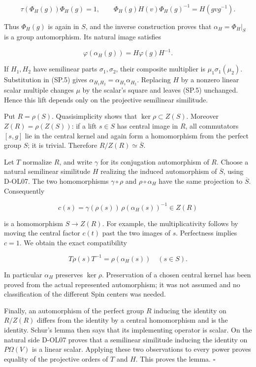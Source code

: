\[
 \tau(\Phi_H(g))\Phi_H(g)=1,\qquad
 \Phi_H(g)H(v)\Phi_H(g)^{-1}=H(gvg^{-1}).
 \tag{SP.8}
\]

Thus \(\Phi_H(g)\) is again in \(S\), and the inverse construction proves that \(\alpha_H=\Phi_H|_S\) is a group automorphism. Its natural image satisfies

\[
 \varphi(\alpha_H(g))=H\varphi(g)H^{-1}.
 \tag{SP.9}
\]

If \(H_1,H_2\) have semilinear parts \(\sigma_1,\sigma_2\), their composite multiplier is \(\mu_1\sigma_1(\mu_2)\). Substitution in (SP.5) gives \(\alpha_{H_1H_2}=\alpha_{H_1}\alpha_{H_2}\). Replacing \(H\) by a nonzero linear scalar multiple changes \(\mu\) by the scalar's square and leaves (SP.5) unchanged. Hence this lift depends only on the projective semilinear similitude.

Put \(R=\rho(S)\). Quasisimplicity shows that \(\ker\rho\subset Z(S)\). Moreover \(Z(R)=\rho(Z(S))\): if a lift \(s\in S\) has central image in \(R\), all commutators \([s,g]\) lie in the central kernel and again form a homomorphism from the perfect group \(S\); it is trivial. Therefore \(R/Z(R)\simeq\overline S\).

Let \(T\) normalize \(R\), and write \(\gamma\) for its conjugation automorphism of \(R\). Choose a natural semilinear similitude \(H\) realizing the induced automorphism of \(\overline S\), using D-OL07. The two homomorphisms \(\gamma\circ\rho\) and \(\rho\circ\alpha_H\) have the same projection to \(\overline S\). Consequently

\[
 c(s)=\gamma(\rho(s))\,\rho(\alpha_H(s))^{-1}\in Z(R)
 \tag{SP.10}
\]

is a homomorphism \(S\to Z(R)\). For example, the multiplicativity follows by moving the central factor \(c(t)\) past the two images of \(s\). Perfectness implies \(c=1\). We obtain the exact compatibility

\[
 T\rho(s)T^{-1}=\rho(\alpha_H(s))\quad(s\in S).
 \tag{SP.11}
\]

In particular \(\alpha_H\) preserves \(\ker\rho\). Preservation of a chosen central kernel has been proved from the actual represented automorphism; it was not assumed and no classification of the different Spin centers was needed.

Finally, an automorphism of the perfect group \(R\) inducing the identity on \(R/Z(R)\) differs from the identity by a central homomorphism and is the identity. Schur's lemma then says that its implementing operator is scalar. On the natural side D-OL07 proves that a semilinear similitude inducing the identity on \(P\Omega(V)\) is a linear scalar. Applying these two observations to every power proves equality of the projective orders of \(T\) and \(H\). This proves the lemma. \(\square\)

